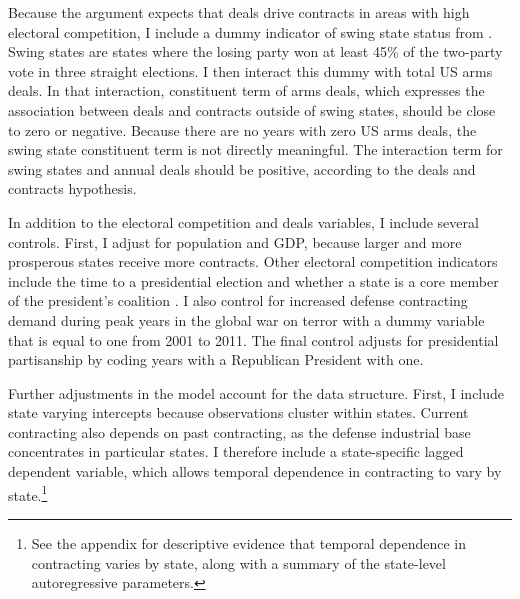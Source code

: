 \documentclass[12pt]{article}
\begin{document}
Because the argument expects that deals drive contracts in areas with high electoral competition, I include a dummy indicator of swing state status from \citep{KrinerReeves2015}.
Swing states are states where the losing party won at least 45\% of the two-party vote in three straight elections. 
I then interact this dummy with total US arms deals. 
In that interaction, constituent term of arms deals, which expresses the association between deals and contracts outside of swing states, should be close to zero or negative.
Because there are no years with zero US arms deals, the swing state constituent term is not directly meaningful.  
The interaction term for swing states and annual deals should be positive, according to the deals and contracts hypothesis.


In addition to the electoral competition and deals variables, I include several controls. 
First, I adjust for population and GDP, because larger and more prosperous states receive more contracts. 
Other electoral competition indicators include the time to a presidential election and whether a state is a core member of the president's coalition \citep{KrinerReeves2015}. 
I also control for increased defense contracting demand during peak years in the global war on terror with a dummy variable that is equal to one from 2001 to 2011. 
The final control adjusts for presidential partisanship by coding years with a Republican President with one. 


Further adjustments in the model account for the data structure.
First, I include state varying intercepts because observations cluster within states. 
Current contracting also depends on past contracting, as the defense industrial base concentrates in particular states. 
I therefore include a state-specific lagged dependent variable, which allows temporal dependence in contracting to vary by state.\footnote{See the appendix for descriptive evidence that temporal dependence in contracting varies by state, along with a summary of the state-level autoregressive parameters.}




\end{document}

